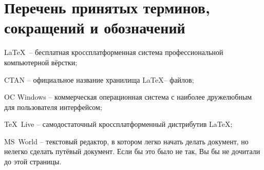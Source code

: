\section{Перечень принятых терминов, сокращений и обозначений}


\par \LaTeX\ – бесплатная кроссплатформенная система профессиональной компьютерной вёрстки;
\par CTAN – официальное название хранилища \LaTeX – файлов;
\par OC Windows – коммерческая операционная система с наиболее дружелюбным для пользователя интерфейсом;
\par \TeX~Live – самодостаточный кроссплатформенный дистрибутив \LaTeX;
\par MS~World – текстовый редактор, в котором легко начать делать документ, но нелегко сделать путёвый документ.
Если бы это было не так, Вы бы не дочитали до этой страницы.


